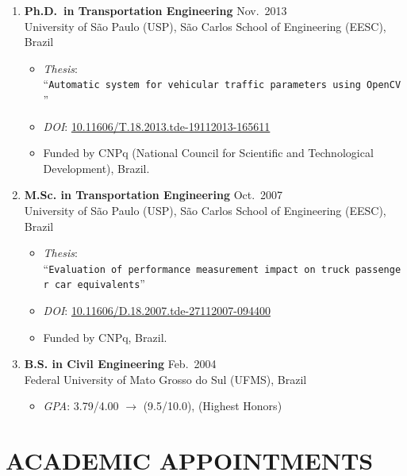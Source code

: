 \documentclass[
  10pt,
  a4paper,
  DIV=11,
  numbers=noendperiod]{scrartcl}
\providecommand{\tightlist}{%
  \setlength{\itemsep}{0pt}\setlength{\parskip}{0pt}}
\begin{document}
\begin{enumerate}
\def\labelenumi{\arabic{enumi}.}
\tightlist
\item
  \textbf{Ph.D.~in Transportation Engineering} \dotfill Nov.~2013\\
  University of São Paulo (USP), São Carlos School of Engineering
  (EESC), Brazil

  \begin{itemize}
  \tightlist
  \item
    \emph{Thesis}:
    ``\texttt{Automatic\ system\ for\ vehicular\ traffic\ parameters\ using\ OpenCV}''
  \item
    \emph{DOI}:
    \href{https://doi.org/10.11606/T.18.2013.tde-19112013-165611}{10.11606/T.18.2013.tde-19112013-165611}
  \item
    Funded by CNPq (National Council for Scientific and Technological
    Development), Brazil.
  \end{itemize}
\item
  \textbf{M.Sc. in Transportation Engineering} \dotfill Oct.~2007\\
  University of São Paulo (USP), São Carlos School of Engineering
  (EESC), Brazil

  \begin{itemize}
  \tightlist
  \item
    \emph{Thesis}:
    ``\texttt{Evaluation\ of\ performance\ measurement\ impact\ on\ truck\ passenger\ car\ equivalents}''
  \item
    \emph{DOI}:
    \href{https://doi.org/10.11606/D.18.2007.tde-27112007-094400}{10.11606/D.18.2007.tde-27112007-094400}
  \item
    Funded by CNPq, Brazil.
  \end{itemize}
\item
  \textbf{B.S. in Civil Engineering} \dotfill Feb.~2004\\
  Federal University of Mato Grosso do Sul (UFMS), Brazil

  \begin{itemize}
  \tightlist
  \item
    \emph{GPA}: 3.79/4.00 \(\rightarrow\) (9.5/10.0), (Highest Honors)
  \end{itemize}
\end{enumerate}

\hrulefill

\section{ACADEMIC APPOINTMENTS}\label{academic-appointments}
\end{document}
